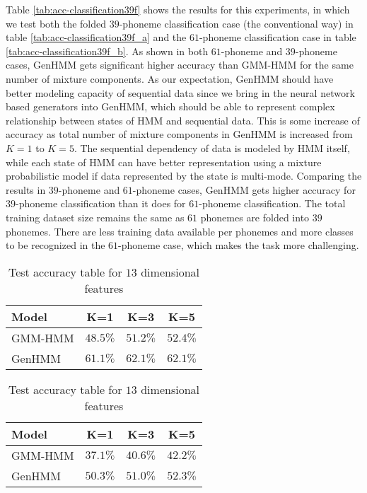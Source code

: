 \documentclass[letterpaper]{article} %
\begin{document}
Table \ref{tab:acc-classification39f} shows the results for this experiments, in which we test both the folded $39$-phoneme classification case (the conventional way) in table \ref{tab:acc-classification39f_a} and the $61$-phoneme classification case in table \ref{tab:acc-classification39f_b}. As shown in both $61$-phoneme and $39$-phoneme cases, GenHMM gets significant higher accuracy than GMM-HMM for the same number of mixture components. As our expectation, GenHMM should have better modeling capacity of sequential data since we bring in the neural network based generators into GenHMM, which should be able to represent complex relationship between states of HMM and sequential data. This is some increase of accuracy as total number of mixture components in GenHMM is increased from $K=1$ to $K=5$. The sequential dependency of data is modeled by HMM itself, while each state of HMM can have better representation using a mixture probabilistic model if data represented by the state is multi-mode. Comparing the results in $39$-phoneme and $61$-phoneme cases, GenHMM gets higher accuracy for $39$-phoneme classification than it does for $61$-phoneme classification. The total training dataset size remains the same as $61$ phonemes are folded into $39$ phonemes. There are less training data available per phonemes and more classes to be recognized in the $61$-phoneme case, which makes the task more challenging.

\begin{table}
  \caption{Test accuracy table for $13$ dimensional features }
  \label{tab:acc-classification13f}
  \vspace{-0.3cm}
  \centering
  \vspace{-0.1cm}
  \centering  
  \begin{tabular}{l|c|c|c}
    \toprule
    {Model} &  K=1 &  K=3 &  K=5  \\  \midrule
    GMM-HMM & $48.5\%$ &  $51.2\%$ &  $52.4\%$  \\ \midrule
    GenHMM & $61.1\%$ & $62.1\%$ & $62.1\%$   \\ 
    \bottomrule                                                                  
  \end{tabular}
  \vspace{0.1cm}
  \vspace{-0.1cm}
  \begin{tabular}{l|c|c|c}
    \toprule
    {Model} &  K=1 &  K=3 &  K=5
    \\ \midrule
    GMM-HMM & $37.1\%$ &  $40.6\%$ & $42.2\%$  \\ \midrule
    GenHMM & $50.3\%$ & $51.0\%$ & $52.3\%$   \\ 
    \bottomrule
  \end{tabular}
  \vspace{0.2cm}
\end{table}
\end{document}
